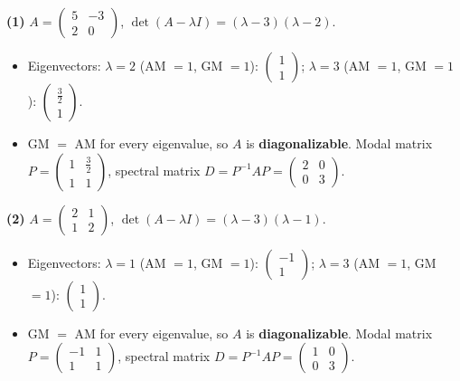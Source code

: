 \noindent\textbf{(1)} $A=\begin{pmatrix}5 & -3 \\ 2 & 0\end{pmatrix}$, $\det(A-\lambda I)=\left(\lambda - 3\right) \left(\lambda - 2\right)$.
\begin{itemize}\item Eigenvectors: $\lambda=2$ (AM $=1$, GM $=1$): $\begin{pmatrix}1 \\ 1\end{pmatrix}$; $\lambda=3$ (AM $=1$, GM $=1$): $\begin{pmatrix}\frac{3}{2} \\ 1\end{pmatrix}$.
\item GM $=$ AM for every eigenvalue, so $A$ is \textbf{diagonalizable}. Modal matrix $P=\begin{pmatrix}1 & \frac{3}{2} \\ 1 & 1\end{pmatrix}$, spectral matrix $D=P^{-1}AP=\begin{pmatrix}2 & 0 \\ 0 & 3\end{pmatrix}$.\end{itemize}

\noindent\textbf{(2)} $A=\begin{pmatrix}2 & 1 \\ 1 & 2\end{pmatrix}$, $\det(A-\lambda I)=\left(\lambda - 3\right) \left(\lambda - 1\right)$.
\begin{itemize}\item Eigenvectors: $\lambda=1$ (AM $=1$, GM $=1$): $\begin{pmatrix}-1 \\ 1\end{pmatrix}$; $\lambda=3$ (AM $=1$, GM $=1$): $\begin{pmatrix}1 \\ 1\end{pmatrix}$.
\item GM $=$ AM for every eigenvalue, so $A$ is \textbf{diagonalizable}. Modal matrix $P=\begin{pmatrix}-1 & 1 \\ 1 & 1\end{pmatrix}$, spectral matrix $D=P^{-1}AP=\begin{pmatrix}1 & 0 \\ 0 & 3\end{pmatrix}$.\end{itemize}

